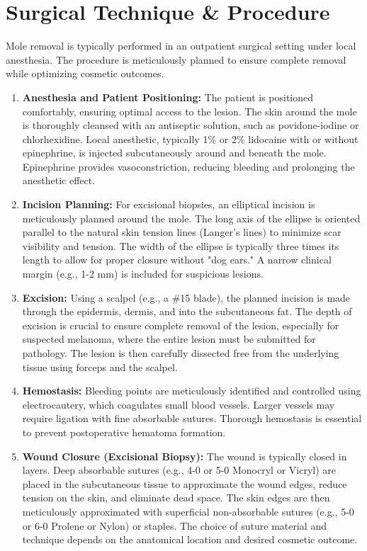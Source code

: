 \section*{Surgical Technique \& Procedure}
Mole removal is typically performed in an outpatient surgical setting under local anesthesia. The procedure is meticulously planned to ensure complete removal while optimizing cosmetic outcomes.

\begin{enumerate}
  \item \textbf{Anesthesia and Patient Positioning:} The patient is positioned comfortably, ensuring optimal access to the lesion. The skin around the mole is thoroughly cleansed with an antiseptic solution, such as povidone-iodine or chlorhexidine. Local anesthetic, typically 1\% or 2\% lidocaine with or without epinephrine, is injected subcutaneously around and beneath the mole. Epinephrine provides vasoconstriction, reducing bleeding and prolonging the anesthetic effect.
  
  \item \textbf{Incision Planning:} For excisional biopsies, an elliptical incision is meticulously planned around the mole. The long axis of the ellipse is oriented parallel to the natural skin tension lines (Langer's lines) to minimize scar visibility and tension. The width of the ellipse is typically three times its length to allow for proper closure without "dog ears." A narrow clinical margin (e.g., 1-2 mm) is included for suspicious lesions.
  
  \item \textbf{Excision:} Using a scalpel (e.g., a \#15 blade), the planned incision is made through the epidermis, dermis, and into the subcutaneous fat. The depth of excision is crucial to ensure complete removal of the lesion, especially for suspected melanoma, where the entire lesion must be submitted for pathology. The lesion is then carefully dissected free from the underlying tissue using forceps and the scalpel.
  
  \item \textbf{Hemostasis:} Bleeding points are meticulously identified and controlled using electrocautery, which coagulates small blood vessels. Larger vessels may require ligation with fine absorbable sutures. Thorough hemostasis is essential to prevent postoperative hematoma formation.
  
  \item \textbf{Wound Closure (Excisional Biopsy):} The wound is typically closed in layers. Deep absorbable sutures (e.g., 4-0 or 5-0 Monocryl or Vicryl) are placed in the subcutaneous tissue to approximate the wound edges, reduce tension on the skin, and eliminate dead space. The skin edges are then meticulously approximated with superficial non-absorbable sutures (e.g., 5-0 or 6-0 Prolene or Nylon) or staples. The choice of suture material and technique depends on the anatomical location and desired cosmetic outcome.
  

\end{enumerate}
